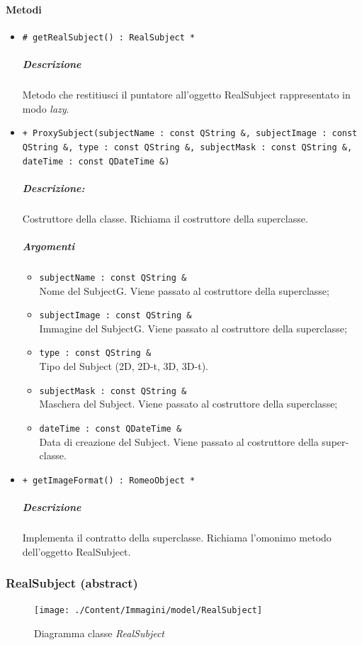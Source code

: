 	\paragraph{\color{black}Metodi}
		\begin{itemize}
			\item \color{blue} \verb!# getRealSubject() : RealSubject *!
			\color{black}
			\subparagraph{Descrizione} Metodo che restitiusci il puntatore all'oggetto RealSubject rappresentato in modo \emph{lazy}.
			\item \color{blue} \verb!+ ProxySubject(subjectName : const QString &, subjectImage : const QString &, type : const QString &, subjectMask : const QString &, dateTime : const QDateTime &)!
			\color{black}
			\subparagraph{Descrizione:} Costruttore della classe. Richiama il costruttore della superclasse.
			\color{black}
			\subparagraph{Argomenti}
			\begin{itemize}
				\item \color{RoyalPurple} \verb!subjectName : const QString &!\\				
\color{black} Nome del SubjectG. Viene passato al costruttore della superclasse;
				\item \color{RoyalPurple} \verb!subjectImage : const QString &!\\				
\color{black} Immagine del SubjectG. Viene passato al costruttore della superclasse;
				\item \color{RoyalPurple} \verb!type : const QString &!\\				
\color{black} Tipo del Subject (2D, 2D-t, 3D, 3D-t).
				\item \color{RoyalPurple} \verb!subjectMask : const QString &!\\				
\color{black} Maschera\g{} del Subject\g{}. Viene passato al costruttore della superclasse;
				\item \color{RoyalPurple} \verb!dateTime : const QDateTime &!\\				
\color{black} Data di creazione del Subject\g{}. Viene passato al costruttore della super- classe.
			\end{itemize}
			\item \color{blue} \verb!+ getImageFormat() : RomeoObject *!
			\color{black}
			\subparagraph{Descrizione} Implementa il contratto della superclasse. Richiama l’omonimo metodo dell’oggetto RealSubject.
		\end{itemize}
	\subsubsection{RealSubject (abstract)}
	\begin{figure}[!h]
		\centering
		\texttt{[image: ./Content/Immagini/model/RealSubject]}
		\caption{Diagramma classe \textsl{RealSubject}}
	\end{figure}
